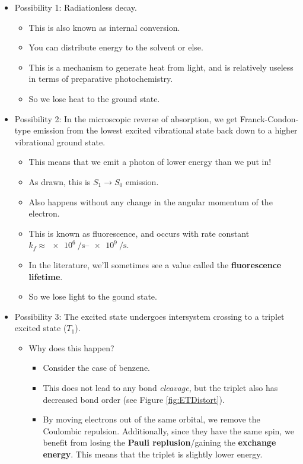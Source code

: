 \documentclass[../notes.tex]{subfiles}
\begin{document}
\begin{itemize}
\begin{itemize}
        \item Possibility 1: Radiationless decay.
        \begin{itemize}
            \item This is also known as internal conversion.
            \item You can distribute energy to the solvent or else.
            \item This is a mechanism to generate heat from light, and is relatively useless in terms of preparative photochemistry.
            \item So we lose heat to the ground state.
        \end{itemize}
        \item Possibility 2: In the microscopic reverse of absorption, we get Franck-Condon-type emission from the lowest excited vibrational state back down to a higher vibrational ground state.
        \begin{itemize}
            \item This means that we emit a photon of lower energy than we put in!
            \item As drawn, this is $S_1\to S_0$ emission.
            \item Also happens without any change in the angular momentum of the electron.
            \item This is known as fluorescence, and occurs with rate constant $k_f\approx\SIrange{e6}{e9}{\per\second}$.
            \item In the literature, we'll sometimes see a value called the \textbf{fluorescence lifetime}.
            \item So we lose light to the gound state.
        \end{itemize}
        \item Possibility 3: The excited state undergoes intersystem crossing to a triplet excited state ($T_1$).
        \begin{itemize}
            \item Why does this happen?
            \begin{itemize}
                \item Consider the case of benzene.
                \item This does not lead to any bond \emph{cleavage}, but the triplet also has decreased bond order (see Figure \ref{fig:ETDistort}).
                \item By moving electrons out of the same orbital, we remove the Coulombic repulsion. Additionally, since they have the same spin, we benefit from losing the \textbf{Pauli replusion}/gaining the \textbf{exchange energy}. This means that the triplet is slightly lower energy.

\end{itemize}
\end{itemize}
\end{itemize}
\end{itemize}
\end{document}
